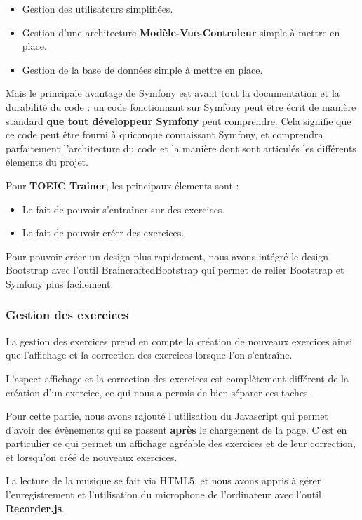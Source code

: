 \documentclass[12pt,a4paper]{report}
\begin{document}
\begin{itemize}
	\item Gestion des utilisateurs simplifiées.
	\item Gestion d'une architecture \textbf{Modèle-Vue-Controleur} simple à
	mettre en place.
	\item Gestion de la base de données simple à mettre en place.
\end{itemize}

Mais le principale avantage de Symfony est avant tout la documentation et la
durabilité du code : un code fonctionnant sur Symfony peut être écrit de
manière standard \textbf{que tout développeur Symfony} peut comprendre. Cela
signifie que ce code peut être fourni à quiconque connaissant Symfony, et
comprendra parfaitement l'architecture du code et la manière dont sont
articulés les différents élements du projet.

Pour \textbf{TOEIC Trainer}, les principaux élements sont :

\begin{itemize}
	\item Le fait de pouvoir s'entraîner sur des exercices.
	\item Le fait de pouvoir créer des exercices.
\end{itemize}

Pour pouvoir créer un design plus rapidement, nous avons intégré le design Bootstrap\cite{Bootstrap} avec l'outil BraincraftedBootstrap\cite{BraincraftedBootstrapBundle} qui permet de relier Bootstrap et Symfony plus facilement.

\subsubsection{Gestion des exercices}

La gestion des exercices prend en compte la création de nouveaux exercices
ainsi que l'affichage et la correction des exercices lorsque l'on s'entraîne.

L'aspect affichage et la correction des exercices est complètement différent de
la création d'un exercice, ce qui nous a permis de bien séparer ces taches.

Pour cette partie, nous avons rajouté l'utilisation du Javascript qui permet
d'avoir des évènements qui se passent \textbf{après} le chargement de la page.
C'est en particulier ce qui permet un affichage agréable des exercices et de leur correction, et lorsqu'on créé de nouveaux exercices.

La lecture de la musique se fait via HTML5, et nous avons appris à gérer
l'enregistrement et l'utilisation du microphone de l'ordinateur avec l'outil
\textbf{Recorder.js}\cite{recorderjs}.
\end{document}
